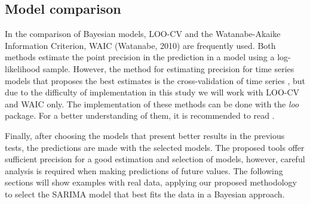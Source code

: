 \subsection{Model comparison} 
In the comparison of Bayesian models, LOO-CV and the Watanabe-Akaike Information Criterion, WAIC (Watanabe, 2010) are frequently used. Both methods estimate the point precision in the prediction in a model using a log-likelihood sample. However, the method for estimating precision for time series models that proposes the best estimates is the cross-validation of time series \citet{cv-time}, but due to the difficulty of implementation in this study we will work with LOO-CV and WAIC only. The implementation of these methods can be done with the \textit{loo} \citet{loo_package} package. For a better understanding of them, it is recommended to read \citet{loo, waic}.

Finally, after choosing the models that present better results in the previous tests, the predictions are made with the selected models. The proposed tools offer sufficient precision for a good estimation and selection of models, however, careful analysis is required when making predictions of future values. The following sections will show examples with real data, applying our proposed methodology to select the SARIMA model that best fits the data in a Bayesian approach.
%
